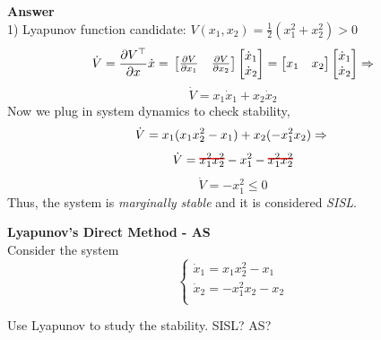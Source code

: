 \documentclass{homeworg}
\newcommand\hcancel[2][black]{\setbox0=\hbox{$#2$}%
\rlap{\raisebox{.45\ht0}{\textcolor{#1}{\rule{\wd0}{1pt}}}}#2}
\begin{document}
\noindent
\textbf{Answer} \\
1) Lyapunov function candidate: \( V(x_1, x_2) = \frac{1}{2} (x_1^2 + x_2^2) > 0\)
\begin{equation*}
\dot{V} = \frac{\partial V^\top}{\partial x} \dot{x} =\\
\begin{bmatrix}
\frac{\partial V}{\partial x_1} & \frac{\partial V}{\partial x_2}
\end{bmatrix}
\begin{bmatrix}
\dot{x}_1 \\
\dot{x}_2
\end{bmatrix}
=
\begin{bmatrix}
  x_1 & x_2
  \end{bmatrix}
  \begin{bmatrix}
  \dot{x}_1 \\
  \dot{x}_2
  \end{bmatrix}
  \Rightarrow
\end{equation*}
\begin{equation*}
\dot{V} =
  x_1 \dot{x}_1 + x_2 \dot{x}_2
\end{equation*}
Now we plug in system dynamics to check stability,
\begin{equation*}
  \dot{V} = x_1 (x_1 x_2^2 - x_1) + x_2(-x_1^2 x_2) \Rightarrow \\
\end{equation*}
\begin{equation*}
  \dot{V} = \hcancel[red]{x_1^2 x_2^2} - x_1^2 - \hcancel[red]{x_1^2 x_2^2}
\end{equation*}
\begin{equation*}
  \dot{V} = - x_1^2 \leq 0
\end{equation*}
Thus, the system is \emph{marginally stable} and it is considered \emph{SISL}.

\exercise
\noindent
\textbf{Lyapunov's Direct Method - AS}\\
Consider the system
\begin{equation*}
  \begin{cases}
    \dot{x}_1 = x_1 x_2^2 - x_1\\
    \dot{x}_2 = -x_1^2 x_2 - x_2\\
  \end{cases}
\end{equation*}

Use Lyapunov to study the stability. SISL? AS?
\end{document}
